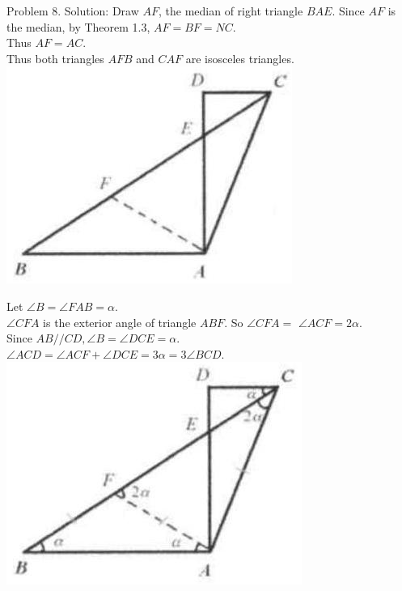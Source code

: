 \documentclass[10pt]{article}
\begin{document}
Problem 8. Solution:
Draw \(A F\), the median of right triangle \(B A E\). Since \(A F\) is the median, by Theorem 1.3, \(A F=B F=N C\).\\
Thus \(A F=A C\).\\
Thus both triangles \(A F B\) and \(C A F\) are isosceles triangles.\\
\includegraphics[max width=\textwidth, center]{2025_04_17_97bc1f7e44d93c271a88g-020(3)}

Let \(\angle B=\angle F A B=\alpha\).\\
\(\angle C F A\) is the exterior angle of triangle \(A B F\). So \(\angle C F A=\) \(\angle A C F=2 \alpha\).\\
Since \(A B / / C D, \angle B=\angle D C E=\alpha\).\\
\(\angle A C D=\angle A C F+\angle D C E=3 \alpha=3 \angle B C D\).\\
\includegraphics[max width=\textwidth, center]{2025_04_17_97bc1f7e44d93c271a88g-020(2)}
\end{document}
